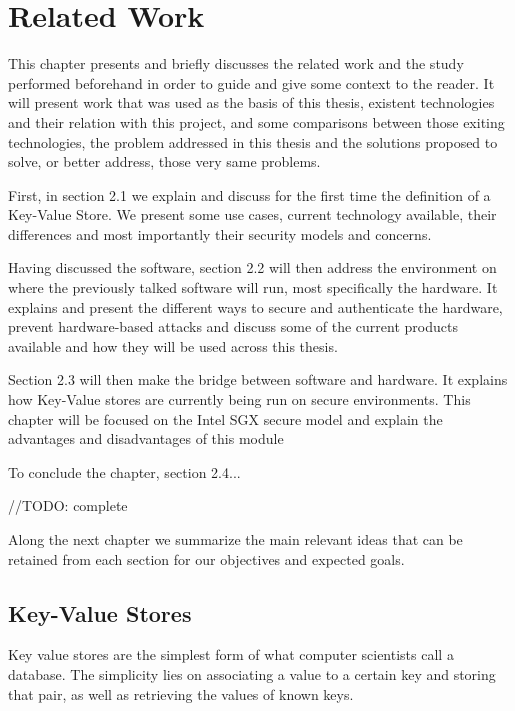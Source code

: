 \chapter{Related Work}
\label{cha:related_work}

This chapter presents and briefly discusses the related work and the study performed beforehand in order to guide and give some context to the reader. It will present work that was used as the basis of this thesis, existent technologies and their relation with this project, and some comparisons between those exiting technologies, the problem addressed in this thesis and the solutions proposed to solve, or better address, those very same problems.

First, in section 2.1 we explain and discuss for the first time the definition of a Key-Value Store. We  present some use cases, current technology available, their differences and most importantly their security models and concerns.

Having discussed the software, section 2.2 will then address the environment on where the previously talked software will run, most specifically the hardware. It explains and present the different ways to secure and authenticate the hardware, prevent hardware-based attacks and discuss some of the current products available and how they will be used across this thesis.

Section 2.3 will then make the bridge between software and hardware. It explains how Key-Value stores are currently being run on secure environments. 
This chapter will be focused on the Intel SGX secure model and explain the advantages and disadvantages of this module

To conclude the chapter, section 2.4... 

//TODO: complete

Along the next chapter we summarize the main relevant ideas that can be retained from each section for our objectives and expected goals.

\section{Key-Value Stores} %
\label{sec:key-value_stores}

Key value stores are the simplest form of what computer scientists call a database. The simplicity lies on associating a value to a certain key and storing that pair, as well as retrieving the values of known keys. \cite{db-engine:1}

